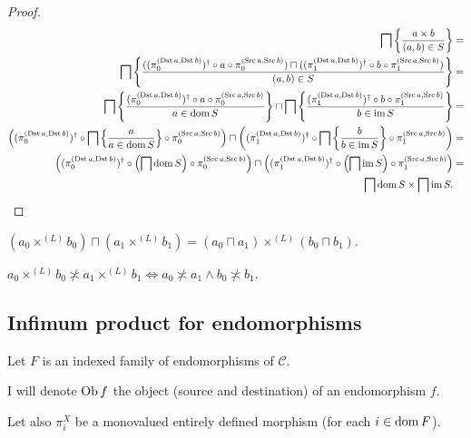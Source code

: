 \begin{proof}
  ~
  \begin{align*}
  \bigsqcap \left\{ \frac{ a \times b }{ (a , b) \in S }\right\} & = \\
  \bigsqcap \left\{ \frac{ ((\pi^{(\operatorname{Dst} a , \operatorname{Dst}
  b)}_0)^{\dagger} \circ a \circ \pi^{(\operatorname{Src} a , \operatorname{Src} b)}_0) \sqcap
  ((\pi^{(\operatorname{Dst} a , \operatorname{Dst} b)}_1)^{\dagger} \circ b \circ
  \pi^{(\operatorname{Src} a , \operatorname{Src} b)}_1) }{ (a , b) \in S }\right\} & = \\
  \bigsqcap \left\{ \frac{ (\pi^{(\operatorname{Dst} a , \operatorname{Dst}
  b)}_0)^{\dagger} \circ a \circ \pi^{(\operatorname{Src} a , \operatorname{Src} b)}_0
  }{ a \in \operatorname{dom} S }\right\} \sqcap
  \bigsqcap
  \left\{ \frac{ (\pi^{(\operatorname{Dst} a , \operatorname{Dst} b)}_1)^{\dagger} \circ b \circ
  \pi^{(\operatorname{Src} a , \operatorname{Src} b)}_1 }{ b \in \operatorname{im} S }\right\} & = \\
  \left( (\pi^{(\operatorname{Dst} a , \operatorname{Dst}
  b)}_0)^{\dagger} \circ \bigsqcap \left\{ \frac{ a }{ a \in
  \operatorname{dom} S }\right\} \circ \pi^{(\operatorname{Src} a , \operatorname{Src} b)}_0 \right)
  \sqcap \left( (\pi^{(\operatorname{Dst} a , \operatorname{Dst} b)}_1)^{\dagger} \circ
  \bigsqcap \left\{ \frac{ b }{ b \in \operatorname{im} S }\right\}
  \circ \pi^{(\operatorname{Src} a , \operatorname{Src} b)}_1 \right) & = \\
  \left(
  (\pi^{(\operatorname{Dst} a , \operatorname{Dst} b)}_0)^{\dagger} \circ \left( \bigsqcap
  \operatorname{dom} S \right) \circ \pi^{(\operatorname{Src} a , \operatorname{Src} b)}_0 \right)
  \sqcap \left( (\pi^{(\operatorname{Dst} a , \operatorname{Dst} b)}_1)^{\dagger} \circ \left(
  \bigsqcap \operatorname{im} S \right) \circ \pi^{(\operatorname{Src} a , \operatorname{Src} b)}_1
  \right) & = \\
  \bigsqcap \operatorname{dom} S \times \bigsqcap \operatorname{im} S.
  \end{align*}
\end{proof}

\begin{cor}
  $(a_0 \times^{(L)} b_0) \sqcap (a_1 \times^{(L)} b_1) = (a_0 \sqcap a_1)
  \times^{(L)} (b_0 \sqcap b_1)$.
\end{cor}

\begin{cor}
  $a_0 \times^{(L)} b_0 \nasymp a_1 \times^{(L)} b_1 \Leftrightarrow a_0
  \nasymp a_1 \wedge b_0 \nasymp b_1$.
\end{cor}

\subsection{Infimum product for endomorphisms}

Let $F$ is an indexed family of endomorphisms of $\mathcal{C}$.

I will denote $\operatorname{Ob} f$ the object (source and destination) of an
endomorphism $f$.

Let also $\pi^X_i$ be a monovalued entirely defined morphism (for each $i \in
\operatorname{dom} F$).

